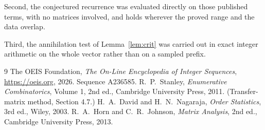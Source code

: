 \documentclass[11pt,a4paper]{article}
\theoremstyle{plain}
\theoremstyle{definition}
\begin{document}
Second, the conjectured recurrence was evaluated directly on those published terms, with no
matrices involved, and holds wherever the proved range and the data overlap.

Third, the annihilation test of Lemma~\ref{lem:crit} was carried out in exact integer
arithmetic on the whole vector rather than on a sampled prefix.

\begin{thebibliography}{9}
 The OEIS Foundation, \emph{The On-Line Encyclopedia of Integer
Sequences}, \url{https://oeis.org}, 2026. Sequence A236585.
 R.~P.~Stanley, \emph{Enumerative Combinatorics}, Volume 1, 2nd ed.,
Cambridge University Press, 2011. (Transfer-matrix method, Section 4.7.)
 H.~A.~David and H.~N.~Nagaraja, \emph{Order Statistics}, 3rd ed., Wiley,
2003.
 R.~A.~Horn and C.~R.~Johnson, \emph{Matrix Analysis}, 2nd ed., Cambridge
University Press, 2013.
\end{thebibliography}
\end{document}

